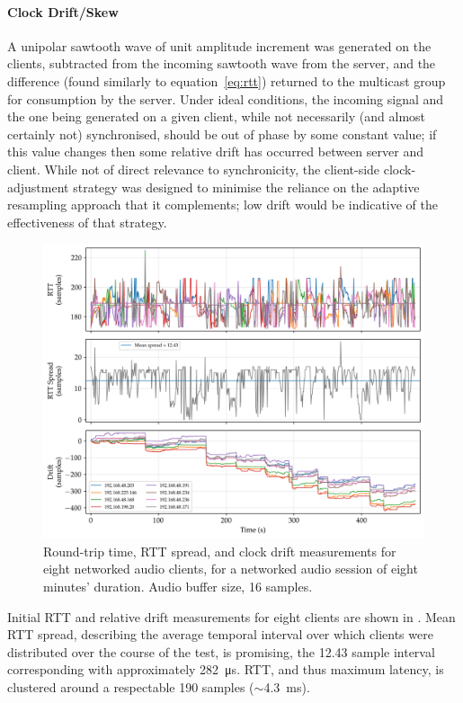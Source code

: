 \paragraph{Clock Drift/Skew} A unipolar sawtooth wave of unit amplitude
increment was generated on the clients, subtracted from the incoming sawtooth
wave from the server, and the difference (found similarly to
equation~\eqref{eq:rtt}) returned to the multicast group for consumption by the
server.
Under ideal conditions, the incoming signal and the one being generated on a
given client, while not necessarily (and almost certainly not) synchronised,
should be out of phase by some constant value;
if this value changes then some relative drift has occurred between server and
client.
While not of direct relevance to synchronicity, the client-side clock-adjustment
strategy was designed to minimise the reliance on the adaptive resampling
approach that it complements;
low drift would be indicative of the effectiveness of that strategy.

\begin{figure}[ht]
    \centering
    \includegraphics[width=\textwidth]{figures/rtt_drift_16}
    \caption{
        Round-trip time, RTT spread, and clock drift measurements for eight
        networked audio clients, for a networked audio session of eight minutes'
        duration.
        Audio buffer size, 16 samples.
    }
    \label{fig:rtt-drift-16}
\end{figure}

Initial RTT and relative drift measurements for eight clients are shown in
.
Mean RTT spread, describing the average temporal interval over which clients
were distributed over the course of the test, is promising, the 12.43 sample
interval corresponding with approximately \qty{282}{\us}.
RTT, and thus maximum latency, is clustered around a respectable 190 samples
($\sim$\qty{4.3}{\ms}).

